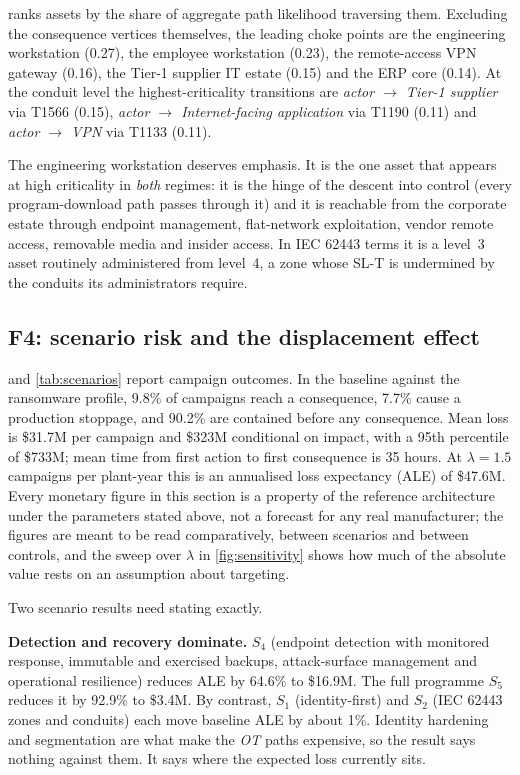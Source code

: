  ranks assets by the share of aggregate path likelihood
traversing them. Excluding the consequence vertices themselves, the leading
choke points are the engineering workstation (0.27), the employee workstation
(0.23), the remote-access VPN gateway (0.16), the Tier-1 supplier IT estate
(0.15) and the ERP core (0.14). At the conduit level the highest-criticality
transitions are \emph{actor $\to$ Tier-1 supplier} via T1566 (0.15),
\emph{actor $\to$ Internet-facing application} via T1190 (0.11) and
\emph{actor $\to$ VPN} via T1133 (0.11).

The engineering workstation deserves emphasis. It is the one asset that appears
at high criticality in \emph{both} regimes: it is the hinge of the descent into
control (every program-download path passes through it) and it is reachable
from the corporate estate through endpoint management, flat-network
exploitation, vendor remote access, removable media and insider access. In IEC
62443 terms it is a level~3 asset routinely administered from level~4, a
zone whose SL-T is undermined by the conduits its administrators require.



\subsection{F4: scenario risk and the displacement effect}

 and \cref{tab:scenarios} report campaign outcomes. In
the baseline against the ransomware profile, 9.8\% of campaigns reach a
consequence, 7.7\% cause a production stoppage, and 90.2\% are contained before
any consequence. Mean loss is \$31.7M per campaign and \$323M conditional on
impact, with a 95th percentile of \$733M; mean time from first action to first
consequence is 35 hours. At $\lambda = 1.5$ campaigns per plant-year this is an annualised loss
expectancy (ALE) of \$47.6M. Every monetary figure in this section is a
property of the reference architecture under the parameters stated above, not
a forecast for any real manufacturer; the figures are meant to be read
comparatively, between scenarios and between controls, and the sweep over
$\lambda$ in \cref{fig:sensitivity} shows how much of the absolute value rests
on an assumption about targeting.

Two scenario results need stating exactly.

\textbf{Detection and recovery dominate.} $S_4$ (endpoint detection with
monitored response, immutable and exercised backups, attack-surface management
and operational resilience) reduces ALE by 64.6\% to \$16.9M. The full
programme $S_5$ reduces it by 92.9\% to \$3.4M. By contrast, $S_1$
(identity-first) and $S_2$ (IEC 62443 zones and conduits) each move baseline ALE
by about 1\%. Identity hardening and segmentation are what make the \emph{OT} paths
expensive, so the result says nothing against them. It says where the expected
loss currently sits.

